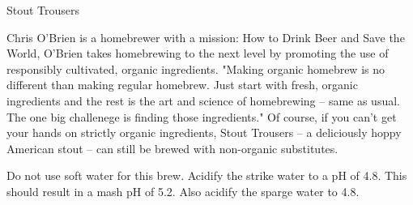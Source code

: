 \begin{recipie}{Stout Trousers}

\begin{aboutblock}
Chris O'Brien is a homebrewer with a mission: How to Drink
Beer and Save the World, O'Brien takes homebrewing to the next level
by promoting the use of responsibly cultivated, organic ingredients.
"Making organic homebrew is no different than making regular homebrew.
Just start with fresh, organic ingredients and the rest is the art and
science of homebrewing -- same as usual. The one big challenege is finding those ingredients." Of course, if you can't get your hands on strictly
organic ingredients, Stout Trousers -- a deliciously hoppy American
stout -- can still be brewed with non-organic substitutes.
\end{aboutblock}


\begin{methodandtiming}
 
\begin{mashsteps}
\end{mashsteps}

\begin{fermentationsteps}
\end{fermentationsteps}

\begin{directions}
Do not use soft water for this brew. Acidify the strike water to a pH of 4.8.
This should result in a mash pH of 5.2. Also acidify the sparge water to 4.8.
\end{directions}

\end{methodandtiming}

\pagebreak

\begin{ingredientsblock}

\begin{malts}
\end{malts}

\begin{hops}
\end{hops}

\begin{yeasts}
\end{yeasts}

\end{ingredientsblock}

\end{recipie}